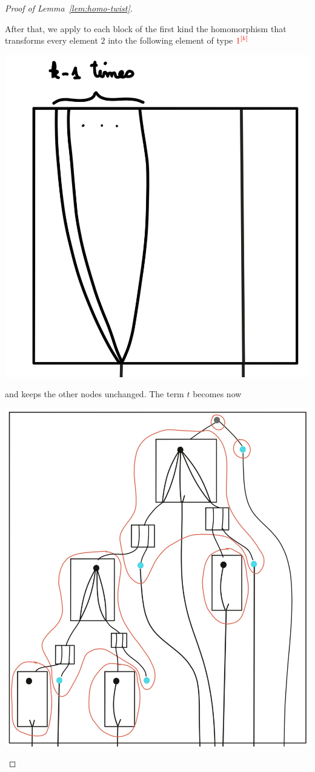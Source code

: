 \begin{proof}[Proof of Lemma~\ref{lem:homo-twist}]
\begin{center}
\end{center}
  After that, we apply to each block of the first kind the homomorphism that transforms every element $2$ into the following element of type $\ranked{\mati k 1}$
  \begin{center}
  \includegraphics[scale=.05]{MyPic24.jpg}
  \end{center}
  and keeps the other nodes unchanged. The term $t$ becomes now
  \begin{center}
  \includegraphics[scale=.1]{MyPic25.jpg}

\end{center}
\end{proof}
